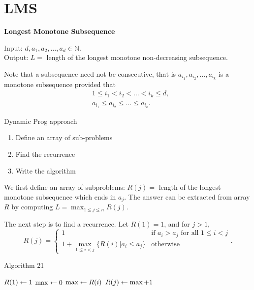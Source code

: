 
\newcommand{\mytitle}{Dynamic Programming}
\newcommand{\mychpnr}{4}


\section{LMS}

\begin{frame}
{\bf Longest Monotone Subsequence}

Input: $d,a_1,a_2,\ldots,a_d\in\mathbb{N}$. \\
Output: $L=$ length of the longest monotone non-decreasing
subsequence.

Note that a subsequence need not be consecutive, that is
$a_{i_1},a_{i_2},\ldots, a_{i_k}$ is a monotone subsequence provided
that
\begin{align*}
& 1\leq i_1<i_2<\ldots<i_k\leq d, \\
& a_{i_1}\leq a_{i_2}\leq\ldots\leq a_{i_k}.
\end{align*}
\end{frame}

\begin{frame}
{Dynamic Prog approach}

\begin{enumerate}
\item Define an array of sub-problems
\item Find the recurrence
\item Write the algorithm
\end{enumerate}
\end{frame}

\begin{frame}
We first define an array of subproblems: $R(j)=$ length of the longest
monotone subsequence which ends in $a_j$.  The answer can be extracted
from array $R$ by computing $L=\max_{1\leq j\leq n}R(j)$.

The next step is to find a recurrence.  Let $R(1)=1$, and for $j>1$,
$$
R(j)=\begin{cases}
1 & \text{if $a_i>a_j$ for all $1\leq i<j$} \\
1+\max_{1\leq i<j}\{R(i)|a_i\leq a_j\} & \text{otherwise}
\end{cases}.
$$
\end{frame}

\begin{frame}
{Algorithm 21}

\begin{algorithmic}[1]
\STATE $R(1)\leftarrow 1$
     \STATE $\max\leftarrow 0$
              \STATE $\text{max}\leftarrow R(i)$
          \ENDIF
     \ENDFOR
     \STATE $R(j)\leftarrow\max+1$
\ENDFOR
\end{algorithmic}
\end{frame}

